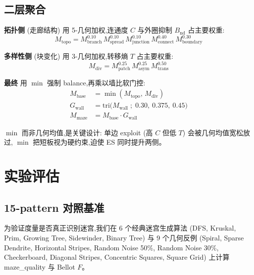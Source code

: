 \documentclass[11pt,a4paper]{article}
\begin{document}
\subsection{二层聚合}
\textbf{拓扑侧} (走廊结构) 用 5-几何加权,连通度 $C$ 与外圈抑制 $B_{\text{nd}}$ 占主要权重:
\begin{equation}
M_{\text{topo}} = M_{\text{branch}}^{0.10}\, M_{\text{spread}}^{0.10}\, M_{\text{junction}}^{0.10}\,
                 M_{\text{connect}}^{0.40}\, M_{\text{boundary}}^{0.30}
\end{equation}

\textbf{多样性侧} (块变化) 用 3-几何加权,转移熵 $T$ 占主要权重:
\begin{equation}
M_{\text{div}} = M_{\text{patch}}^{0.25}\, M_{\text{asym}}^{0.25}\, M_{\text{trans}}^{0.50}
\end{equation}

\textbf{最终} 用 $\min$ 强制 balance,再乘以墙比软门控:
\begin{align}
M_{\text{base}} &= \min(M_{\text{topo}},\, M_{\text{div}}) \\
G_{\text{wall}} &= \text{tri}\big(M_{\text{wall}}\;;\; 0.30,\ 0.375,\ 0.45\big) \\
M_{\text{maze}} &= M_{\text{base}} \cdot G_{\text{wall}}
\end{align}

$\min$ 而非几何均值,是关键设计:
单边 exploit (高 $C$ 但低 $T$) 会被几何均值宽松放过,
$\min$ 把短板视为硬约束,迫使 ES 同时提升两侧。

\section{实验评估}

\subsection{15-pattern 对照基准}
为验证度量是否真正识别迷宫,我们在 6 个经典迷宫生成算法
(DFS, Kruskal, Prim, Growing Tree, Sidewinder, Binary Tree)
与 9 个几何反例 (Spiral, Sparse Dendrite, Horizontal Stripes,
Random Noise 50\%, Random Noise 30\%, Checkerboard, Diagonal Stripes,
Concentric Squares, Square Grid) 上计算 maze\_quality 与 Bellot $F$。
\end{document}
